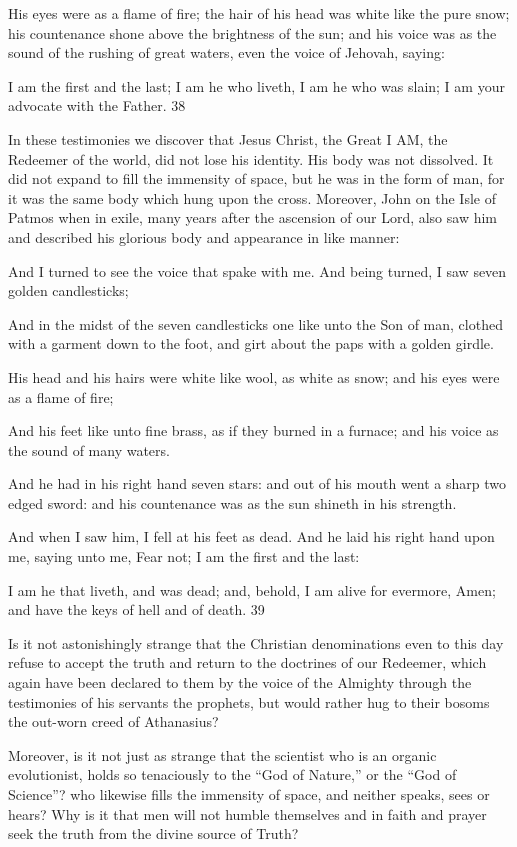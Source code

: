His eyes were as a flame of fire; the hair of his head was white like the pure snow; his
countenance shone above the brightness of the sun; and his voice was as the sound of the
rushing of great waters, even the voice of Jehovah, saying:

I am the first and the last; I am he who liveth, I am he who was slain; I am your advocate
with the Father. 38

In these testimonies we discover that Jesus Christ, the Great I AM, the Redeemer of the
world, did not lose his identity. His body was not dissolved. It did not expand to fill the
immensity of space, but he was in the form of man, for it was the same body which hung
upon the cross. Moreover, John on the Isle of Patmos when in exile, many years after the
ascension of our Lord, also saw him and described his glorious body and appearance in like
manner:

And I turned to see the voice that spake with me. And being turned, I saw seven golden
candlesticks;

And in the midst of the seven candlesticks one like unto the Son of man, clothed with a
garment down to the foot, and girt about the paps with a golden girdle.

His head and his hairs were white like wool, as white as snow; and his eyes were as a flame
of fire;

And his feet like unto fine brass, as if they burned in a furnace; and his voice as the sound of
many waters.

And he had in his right hand seven stars: and out of his mouth went a sharp two edged sword:
and his countenance was as the sun shineth in his strength.

And when I saw him, I fell at his feet as dead. And he laid his right hand upon me, saying
unto me, Fear not; I am the first and the last:

I am he that liveth, and was dead; and, behold, I am alive for evermore, Amen; and have the
keys of hell and of death. 39

Is it not astonishingly strange that the Christian denominations even to this day refuse to
accept the truth and return to the doctrines of our Redeemer, which again have been declared
to them by the voice of the Almighty through the testimonies of his servants the prophets, but
would rather hug to their bosoms the out-worn creed of Athanasius?

Moreover, is it not just as strange that the scientist who is an organic evolutionist, holds so
tenaciously to the ``God of Nature,'' or the ``God of Science''? who likewise fills the
immensity of space, and neither speaks, sees or hears? Why is it that men will not humble
themselves and in faith and prayer seek the truth from the divine source of Truth?

